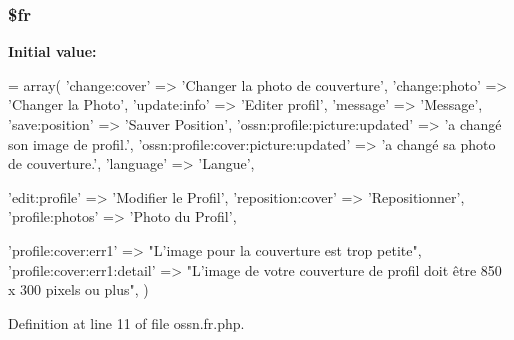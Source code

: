 \subsubsection[{\texorpdfstring{\$fr}{$fr}}]{\setlength{\rightskip}{0pt plus 5cm}\$fr}\hypertarget{components_2_ossn_profile_2locale_2ossn_8fr_8php_ad5107c697816e7b7f89ad1b3e94e3e0e}{}\label{components_2_ossn_profile_2locale_2ossn_8fr_8php_ad5107c697816e7b7f89ad1b3e94e3e0e}
{\bfseries Initial value\+:}
\begin{DoxyCode}
= array(
    \textcolor{stringliteral}{'change:cover'} => \textcolor{stringliteral}{'Changer la photo de couverture'},
    \textcolor{stringliteral}{'change:photo'} => \textcolor{stringliteral}{'Changer la Photo'},
    \textcolor{stringliteral}{'update:info'} => \textcolor{stringliteral}{'Editer profil'},
    \textcolor{stringliteral}{'message'} => \textcolor{stringliteral}{'Message'},
    \textcolor{stringliteral}{'save:position'} => \textcolor{stringliteral}{'Sauver Position'},
    \textcolor{stringliteral}{'ossn:profile:picture:updated'} => \textcolor{stringliteral}{'a changé son image de profil.'},
    \textcolor{stringliteral}{'ossn:profile:cover:picture:updated'} => \textcolor{stringliteral}{'a changé sa photo de couverture.'},
    \textcolor{stringliteral}{'language'} => \textcolor{stringliteral}{'Langue'},
    
    \textcolor{stringliteral}{'edit:profile'} => \textcolor{stringliteral}{'Modifier le Profil'},
    \textcolor{stringliteral}{'reposition:cover'} => \textcolor{stringliteral}{'Repositionner'},
    \textcolor{stringliteral}{'profile:photos'} => \textcolor{stringliteral}{'Photo du Profil'},
        
    \textcolor{stringliteral}{'profile:cover:err1'} => \textcolor{stringliteral}{"L'image pour la couverture est trop petite"},
    \textcolor{stringliteral}{'profile:cover:err1:detail'} => \textcolor{stringliteral}{"L'image de votre couverture de profil doit être 850 x 300 pixels ou
       plus"},  
)
\end{DoxyCode}


Definition at line 11 of file ossn.\+fr.\+php.


